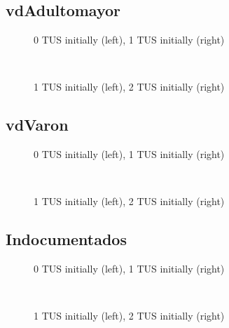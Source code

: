 \documentclass[12pt]{article}
\begin{document}
\subsection{vdAdultomayor}
\begin{figure}[H]%
	\centering
	\caption*{0 TUS initially (left), 1 TUS initially (right)}
	 \quad 
	 \\
	
	\caption*{1 TUS initially (left), 2 TUS initially (right)}
	 \qquad
	\label{fig:vdAdultomayorTwo}%
\end{figure}

\subsection{vdVaron}
\begin{figure}[H]%
	\centering
	\caption*{0 TUS initially (left), 1 TUS initially (right)}
	 \quad 
	 \\
	
	\caption*{1 TUS initially (left), 2 TUS initially (right)}
	 \qquad
	\label{fig:vdVaronTwo}%
\end{figure}

\subsection{Indocumentados}
\begin{figure}[H]%
	\centering
	\caption*{0 TUS initially (left), 1 TUS initially (right)}
	 \quad 
	 \\
	
	\caption*{1 TUS initially (left), 2 TUS initially (right)}
	 \qquad
	\label{fig:indocumentadosTwo}%
\end{figure}
\end{document}
